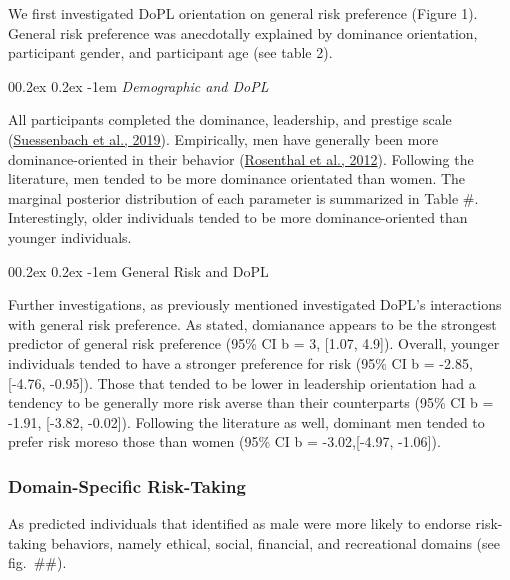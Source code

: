 \documentclass[
  donotrepeattitle,doc, 12pt, a4paper,floatsintext]{apa7}
\makeatletter
\let\oldparagraph\paragraph
\renewcommand{\paragraph}[1]{\oldparagraph{#1}\mbox{}}
\renewcommand{\paragraph}{\@startsection{paragraph}{4}{\parindent}%
  {0\baselineskip \@plus 0.2ex \@minus 0.2ex}%
  {-1em}%
  {\normalfont\normalsize\bfseries\itshape\typesectitle}}
\makeatother
\begin{document}
We first investigated DoPL orientation on general risk preference (Figure 1). General risk preference was anecdotally explained by dominance orientation, participant gender, and participant age (see table 2).

\hypertarget{demographic-and-dopl-1}{%
\paragraph{\texorpdfstring{\emph{Demographic and DoPL}}{Demographic and DoPL}}\label{demographic-and-dopl-1}}

All participants completed the dominance, leadership, and prestige scale (\protect\hyperlink{ref-suessenbach2019}{Suessenbach et al., 2019}). Empirically, men have generally been more dominance-oriented in their behavior (\protect\hyperlink{ref-rosenthal2012}{Rosenthal et al., 2012}). Following the literature, men tended to be more dominance orientated than women. The marginal posterior distribution of each parameter is summarized in Table \#. Interestingly, older individuals tended to be more dominance-oriented than younger individuals.

\hypertarget{general-risk-and-dopl}{%
\paragraph{General Risk and DoPL}\label{general-risk-and-dopl}}

Further investigations, as previously mentioned investigated DoPL's interactions with general risk preference. As stated, domianance appears to be the strongest predictor of general risk preference (95\% CI b = 3, {[}1.07, 4.9{]}). Overall, younger individuals tended to have a stronger preference for risk (95\% CI b = -2.85, {[}-4.76, -0.95{]}). Those that tended to be lower in leadership orientation had a tendency to be generally more risk averse than their counterparts (95\% CI b = -1.91, {[}-3.82, -0.02{]}). Following the literature as well, dominant men tended to prefer risk moreso those than women (95\% CI b = -3.02,{[}-4.97, -1.06{]}).

\hypertarget{domain-specific-risk-taking-1}{%
\subsubsection{Domain-Specific Risk-Taking}\label{domain-specific-risk-taking-1}}

As predicted individuals that identified as male were more likely to endorse risk-taking behaviors, namely ethical, social, financial, and recreational domains (see fig.~\#\#).
\end{document}
